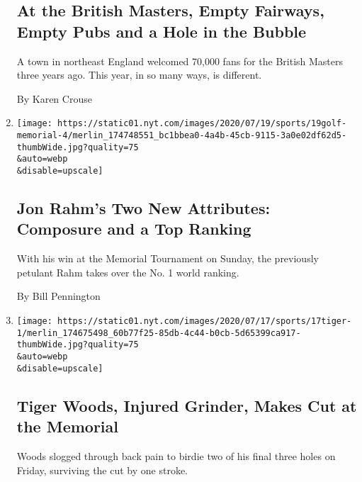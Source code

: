 \begin{enumerate}
  \hypertarget{at-the-british-masters-empty-fairways-empty-pubs-and-a-hole-in-the-bubble}{%
  \subsection{At the British Masters, Empty Fairways, Empty Pubs and a
  Hole in the
  Bubble}\label{at-the-british-masters-empty-fairways-empty-pubs-and-a-hole-in-the-bubble}}

  A town in northeast England welcomed 70,000 fans for the British
  Masters three years ago. This year, in so many ways, is different.

  By Karen Crouse
\item
  \href{/2020/07/19/sports/golf/jon-rahm-penalty-memorial-tournament-score.html}{}

  \texttt{[image: https://static01.nyt.com/images/2020/07/19/sports/19golf-memorial-4/merlin\_174748551\_bc1bbea0-4a4b-45cb-9115-3a0e02df62d5-thumbWide.jpg?quality=75\\\&auto=webp\\\&disable=upscale]}

  \hypertarget{jon-rahms-two-new-attributes-composure-and-a-top-ranking}{%
  \subsection{Jon Rahm's Two New Attributes: Composure and a Top
  Ranking}\label{jon-rahms-two-new-attributes-composure-and-a-top-ranking}}

  With his win at the Memorial Tournament on Sunday, the previously
  petulant Rahm takes over the No. 1 world ranking.

  By Bill Pennington
\item
  \href{/2020/07/17/sports/golf/tiger-woods-memorial-tournament-score.html}{}

  \texttt{[image: https://static01.nyt.com/images/2020/07/17/sports/17tiger-1/merlin\_174675498\_60b77f25-85db-4c44-b0cb-5d65399ca917-thumbWide.jpg?quality=75\\\&auto=webp\\\&disable=upscale]}

  \hypertarget{tiger-woods-injured-grinder-makes-cut-at-the-memorial}{%
  \subsection{Tiger Woods, Injured Grinder, Makes Cut at the
  Memorial}\label{tiger-woods-injured-grinder-makes-cut-at-the-memorial}}

  Woods slogged through back pain to birdie two of his final three holes
  on Friday, surviving the cut by one stroke.


\end{enumerate}
